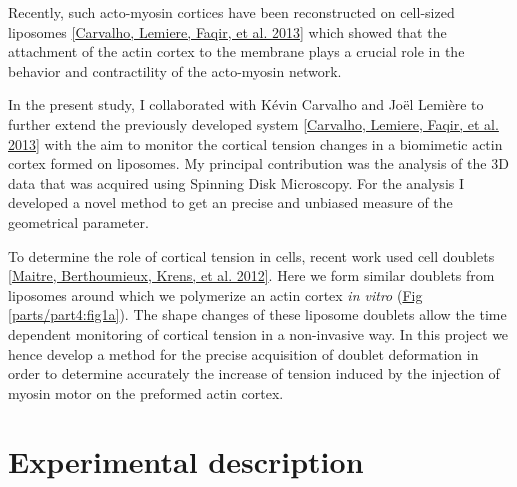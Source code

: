 \documentclass[A4paperpaper,11pt,english]{sphinxmanual}
\begin{document}
Recently, such acto-myosin cortices have been reconstructed on cell-sized
liposomes {\hyperref[parts/part4:carvalho2013a]{{[}Carvalho, Lemiere, Faqir,  et al.  2013{]}}} which showed that the attachment of the actin
cortex to the membrane plays a crucial role in the behavior and contractility
of the acto-myosin network.

In the present study, I collaborated with Kévin Carvalho and Joël Lemière to
further extend the previously developed system {\hyperref[parts/part4:carvalho2013a]{{[}Carvalho, Lemiere, Faqir,  et al.  2013{]}}} with the
aim to monitor the cortical tension changes in a biomimetic actin cortex formed
on liposomes. My principal contribution was the analysis of the 3D data that
was acquired using Spinning Disk Microscopy. For the analysis I developed a
novel method to get an precise and unbiased measure of the geometrical
parameter.

To determine the role of cortical tension in cells, recent work used cell
doublets {\hyperref[parts/part4:maitre2012]{{[}Maitre, Berthoumieux, Krens,  et al.  2012{]}}}.  Here we form similar doublets from liposomes
around which we polymerize an actin cortex \emph{in vitro} (\hyperref[parts/part4:fig1a]{Fig  \ref*{parts/part4:fig1a}}). The
shape changes of these liposome doublets allow the time dependent monitoring of
cortical tension in a non-invasive way.  In this project we hence develop a
method for the precise acquisition of doublet deformation in order to determine
accurately the increase of tension induced by the injection of myosin motor on
the preformed actin cortex.


\section{Experimental description}
\label{parts/part4:experimental-description}
\end{document}
